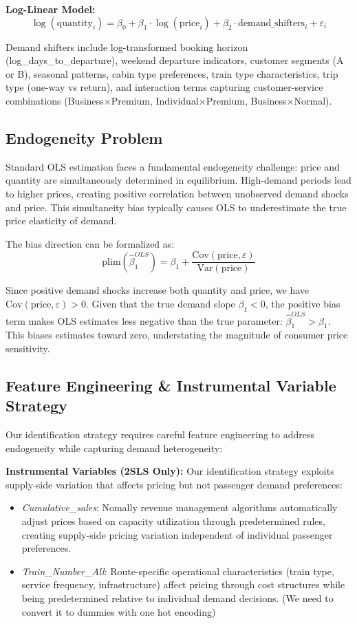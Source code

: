 \documentclass[12pt]{article}
\begin{document}
\textbf{Log-Linear Model:}
\begin{equation}
\log(\text{quantity}_i) = \beta_0 + \beta_1 \cdot \log(\text{price}_i) + \beta_2 \cdot \text{demand\_shifters}_i + \varepsilon_i
\end{equation}

Demand shifters include log-transformed booking horizon (log\_days\_to\_departure), weekend departure indicators, customer segments (A or B), seasonal patterns, cabin type preferences, train type characteristics, trip type (one-way vs return), and interaction terms capturing customer-service combinations (Business×Premium, Individual×Premium, Business×Normal).

\subsection{Endogeneity Problem}
Standard OLS estimation faces a fundamental endogeneity challenge: price and quantity are simultaneously determined in equilibrium. High-demand periods lead to higher prices, creating positive correlation between unobserved demand shocks and price. This simultaneity bias typically causes OLS to underestimate the true price elasticity of demand.

The bias direction can be formalized as:
\begin{equation}
\text{plim}(\hat{\beta}_1^{OLS}) = \beta_1 + \frac{\text{Cov}(\text{price}, \varepsilon)}{\text{Var}(\text{price})}
\end{equation}

Since positive demand shocks increase both quantity and price, we have $\text{Cov}(\text{price}, \varepsilon) > 0$. Given that the true demand slope $\beta_1 < 0$, the positive bias term makes OLS estimates less negative than the true parameter: $\hat{\beta}_1^{OLS} > \beta_1$. This biases estimates toward zero, understating the magnitude of consumer price sensitivity.

\subsection{Feature Engineering \& Instrumental Variable Strategy}
Our identification strategy requires careful feature engineering to address endogeneity while capturing demand heterogeneity:

\textbf{Instrumental Variables (2SLS Only):}
Our identification strategy exploits supply-side variation that affects pricing but not passenger demand preferences:
\begin{itemize}
    \item \textit{Cumulative\_sales}: Nomally revenue management algorithms automatically adjust prices based on capacity utilization through predetermined rules, creating supply-side pricing variation independent of individual passenger preferences.
    \item \textit{Train\_Number\_All}: Route-specific operational characteristics (train type, service frequency, infrastructure) affect pricing through cost structures while being predetermined relative to individual demand decisions. (We need to convert it to dummies with one hot encoding)
\end{itemize}
\end{document}
